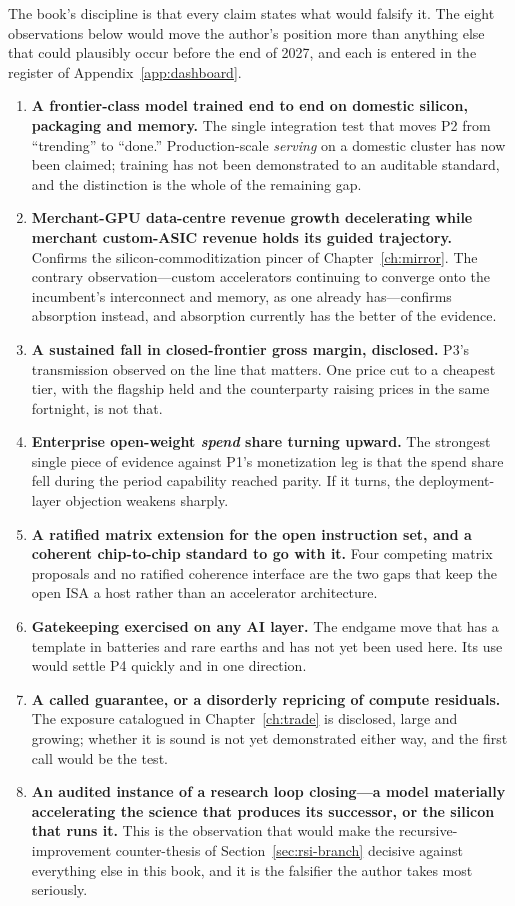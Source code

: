 The book's discipline is that every claim states what would falsify it. The eight observations below would move the author's position more than anything else that could plausibly occur before the end of 2027, and each is entered in the register of Appendix~\ref{app:dashboard}.

\begin{enumerate}
\item \textbf{A frontier-class model trained end to end on domestic silicon, packaging and memory.} The single integration test that moves P2 from ``trending'' to ``done.'' Production-scale \emph{serving} on a domestic cluster has now been claimed; training has not been demonstrated to an auditable standard, and the distinction is the whole of the remaining gap.
\item \textbf{Merchant-GPU data-centre revenue growth decelerating while merchant custom-ASIC revenue holds its guided trajectory.} Confirms the silicon-commoditization pincer of Chapter~\ref{ch:mirror}. The contrary observation---custom accelerators continuing to converge onto the incumbent's interconnect and memory, as one already has---confirms absorption instead, and absorption currently has the better of the evidence.
\item \textbf{A sustained fall in closed-frontier gross margin, disclosed.} P3's transmission observed on the line that matters. One price cut to a cheapest tier, with the flagship held and the counterparty raising prices in the same fortnight, is not that.
\item \textbf{Enterprise open-weight \emph{spend} share turning upward.} The strongest single piece of evidence against P1's monetization leg is that the spend share fell during the period capability reached parity. If it turns, the deployment-layer objection weakens sharply.
\item \textbf{A ratified matrix extension for the open instruction set, and a coherent chip-to-chip standard to go with it.} Four competing matrix proposals and no ratified coherence interface are the two gaps that keep the open ISA a host rather than an accelerator architecture.
\item \textbf{Gatekeeping exercised on any AI layer.} The endgame move that has a template in batteries and rare earths and has not yet been used here. Its use would settle P4 quickly and in one direction.
\item \textbf{A called guarantee, or a disorderly repricing of compute residuals.} The exposure catalogued in Chapter~\ref{ch:trade} is disclosed, large and growing; whether it is sound is not yet demonstrated either way, and the first call would be the test.
\item \textbf{An audited instance of a research loop closing---a model materially accelerating the science that produces its successor, or the silicon that runs it.} This is the observation that would make the recursive-improvement counter-thesis of Section~\ref{sec:rsi-branch} decisive against everything else in this book, and it is the falsifier the author takes most seriously.
\end{enumerate}

